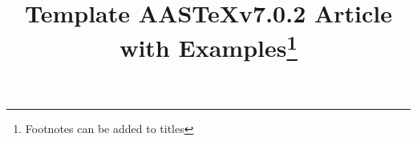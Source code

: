 \documentclass[linenumbers,amsmath,trackchanges]{aastex702}
\newcommand\aastex{AAS\TeX}
\begin{document}
\title{Template \aastex v7.0.2 Article with Examples\footnote{Footnotes can be added to titles}}

\end{document}

